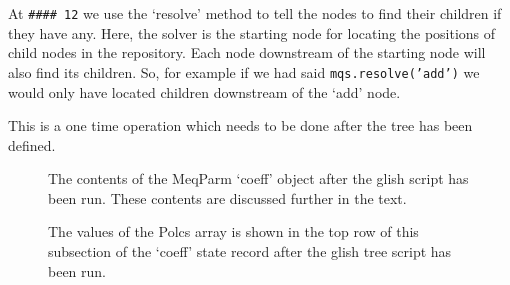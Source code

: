 \documentclass[10pt]{article}
\begin{document}
At {\tt \#\#\#\# 12}  we use the `resolve' method to tell the nodes
to find their children if they have any.
Here, the solver is the starting node for
locating the positions of child nodes in the repository. Each
node downstream of the starting node will also find its children.
So, for example if we had said {\tt mqs.resolve('add')} we would only
have located children downstream of the `add' node.

This is a one time operation which needs to be done after the tree has been
defined.

\begin{figure}
{\par\centering
{}
\par}
\caption {The contents of the MeqParm `coeff' object after the glish
script has been run. These contents are discussed further in the text.}
\label{fig:coeff}
\end{figure}

\begin{figure}
{\par\centering
{}
\par}
\caption {The values of the Polcs array is shown in the top row of
this subsection of the `coeff' state record after the glish tree script
has been run.}
\label{fig:coeff_polcs}
\end{figure}
\end{document}
